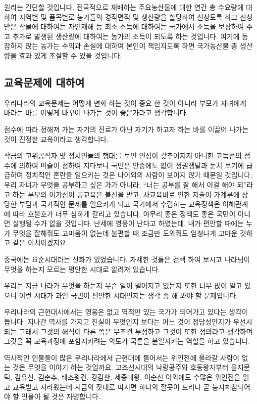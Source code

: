 \documentclass[chapter,book,openany,twoside]{oblivoir}
\begin{document}
원리는 간단할 것입니다. 전국적으로 재배하는 주요농산물에 대한 연간 총 수요량에 대하여 지역별 및 품목별로 농가들의 경작면적 및 생산량을 할당하여 신청토록 하고 신청 받은 작물에 대하여는 자연재해 등 최소 소득에 대하여는 국가에서 소득을 보장하여 주고 추가로 발생된 생산량에 대하여는 농가의 소득이 되도록 하는 것입니다. 여기에 동참하지 않는 농가는 수익과 손실에 대하여 본인이 책임지도록 하면 국가농산물 총 생산량을 효과 있게 조절할 수 있을 것입니다.

\subsection{교육문제에 대하여}

우리나라의 교육문제는 어떻게 변화 하는 것이 중요 한 것이 아니라 부모가 자녀에게 바라는 바를 어떻게 바꾸어 나가는 것이 좋은가라고 생각합니다.

점수에 따라 정해져 가는 자기의 진로가 아닌 자기가 하고자 하는 바를 이끌어 나가는 것이 진정한 교육이라고 생각합니다.

작금의 고위공직자 및 정치인들의 행태를 보면 인성이 갖추어지지 아니한 고득점의 점수에 의하여 벼슬이 정하여 지다보니 국민은 안중에도 없이 정권쟁탈과 눈치 보기에 급급하여 정치적인 혼란을 일으키는 것은 나이외의 사람이 보이지 않기 때문일 것입니다. 우리 자녀가 무엇을 공부하고 싶은 가가 아니라, ``너는 공부를 잘 해서 이걸 해야 되''라고 하는 부모의 이기심이 공교육은 불신을 받고, 사교육비로 인한 지출이 가계부에 상당한 부담과 국가적인 문제를 일으키게 되고 국가에서 수립하는 교육정책은 이해관계에 따라 호불호가 너무 심하게 갈리고 있습니다. 아무리 좋은 정책도 좋은 국민이 아니면 실행될 수가 없을 것입니다. 난세에 영웅이 난다고 하였는데, 내가 편안할 때에는 누가 무엇을 잘해줘도 고마움이 없는데 불편할 때 조금만 도와줘도 엄청나게 고마운 것하고 같은 이치이겠지요. 

중국에는 요순시대라는 신화가 있었습니다. 자세한 것들은 검색 하여 보시고 나라님이 무엇을 하는지 모르는 평안한 시대로 알려져 있습니다. 

우리는 지금 나라가 무엇을 하는지 무슨 일이 벌어지고 있는지 또한 너무 많이 알고 있으니 이런 시대가 과연 국민이 편안한 시대인지는 생각 좀 해 봐야 할 문제입니다.

우리나라의 근현대사에서는 영웅은 없고 역적만 있는 국가가 되어가고 있다는 생각이 듭니다. 지나간 역사를 가지고 진실이 무엇인지 보다는 어느 것이 정당성인지가 우선시 되는 그래서 그것의 해석이 다른 쪽은 무조건 부정하고 그것이 또한 정의라고 생각하며 그것을 꼭 교육과정에 포함시키려는 의도가 국론을 분열시키는 역할을 하고 있습니다.

역사적인 인물들이 많은 우리나라에서 근현대에 들어서는 위인전에 올라갈 사람이 없는 것은 무엇을 이야기 하는 것일까요. 고조선시대의 낙랑공주와 호동왕자부터 을지문덕, 김유신, 김춘추, 태조왕건, 강감찬, 세종대왕, 이순신 이외에도 수많은 위인전을 읽고 교육받고 자라왔는데 지금의 잣대로 따지면 하나의 잘못이 드러나 곧 능지처참되어야 할 인물이 될 것은 자명합니다.
\end{document}
